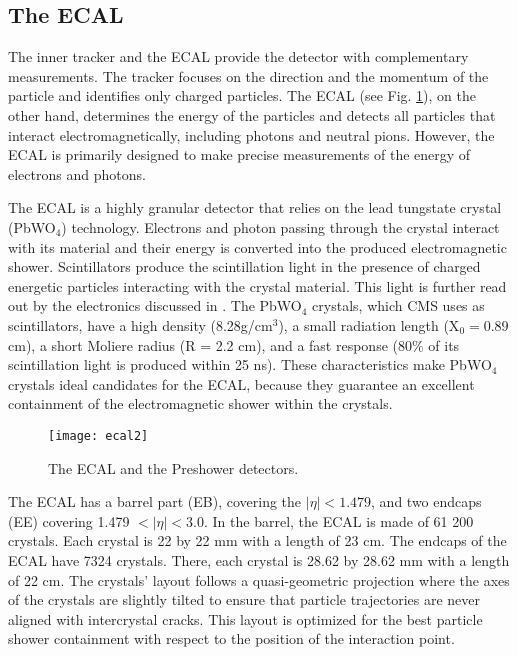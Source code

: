 \begin{normalsize}


\subsection{The ECAL}


The inner tracker and the ECAL provide the detector with complementary measurements. The tracker focuses on the direction and the momentum of the particle and identifies only charged particles. The ECAL  \cite{ECAL_attendum} (see Fig. \ref{ecal2}), on the other hand, determines the energy of the particles and detects all particles that interact electromagnetically, including photons and neutral pions. However, the ECAL is primarily designed to make precise measurements of the energy of electrons and photons. 

The ECAL is a highly granular detector that relies on the lead tungstate crystal (PbWO$_4$) technology. Electrons and photon passing through the crystal interact with its material and their energy is converted into the produced electromagnetic shower. Scintillators produce the scintillation light in the presence of charged energetic particles interacting with the crystal material. This light is further read out by the electronics discussed in \cite{CMS_TDR}. The PbWO$_4$ crystals, which CMS uses as scintillators, have a high density (8.28g/cm$^3$), a small radiation length (X$_0 = 0.89$ cm), a short Moliere radius (R = 2.2 cm), and a fast response (80$\%$ of its scintillation light is produced within 25 ns). These characteristics make PbWO$_4$ crystals ideal candidates for the ECAL, because they guarantee an excellent containment of the electromagnetic shower within the crystals. 



\begin{figure}[H]
  \centering
  \texttt{[image: ecal2]}
  \caption[The ECAL]{The ECAL and the Preshower detectors.}
  \label{ecal2}
\end{figure}

The ECAL has a barrel part (EB), covering the $|\eta|< 1.479$, and two endcaps (EE) covering 1.479 $< |\eta |  < 3.0$. In the barrel, the ECAL is made of 61 200 crystals. Each crystal is 22 by 22 mm with a length of 23 cm. The endcaps of the ECAL have 7324 crystals. There, each crystal is 28.62 by 28.62 mm with a length of 22 cm. The crystals' layout follows a quasi-geometric projection where the axes of the crystals are slightly tilted to ensure that particle trajectories are never aligned with intercrystal cracks. This layout is optimized for the best particle shower containment with respect to the position of the interaction point.  


\end{normalsize}
